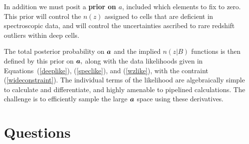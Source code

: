 \documentclass[11pt,preprint,flushrt]{aastex631}
\newcommand{\veca}{\mbox{\boldmath $a$}}
\begin{document}
In addition we must posit a \textbf{prior on \veca}, included which
elements to fix to zero.  This prior will control the $n(z)$ assigned
to cells that are deficient in spectroscopic data, and will control
the uncertainties ascribed to rare redshift outliers within deep
cells.

The total posterior probability on $\veca$ and the implied $n(z|B)$
functions is then defined by this prior on 
$\veca,$ along with the data likelihoods given in
Equations~(\ref{deeplike}),
(\ref{speclike}), and (\ref{wzlike}), with the contraint
(\ref{wideconstraint}).  The individual terms of the likelihood are
algebraically simple to calculate and differentiate, and highly
amenable to pipelined calculations.  The challenge is
to efficiently sample the large $\veca$ space using these derivatives.


\section{Questions}
\end{document}
